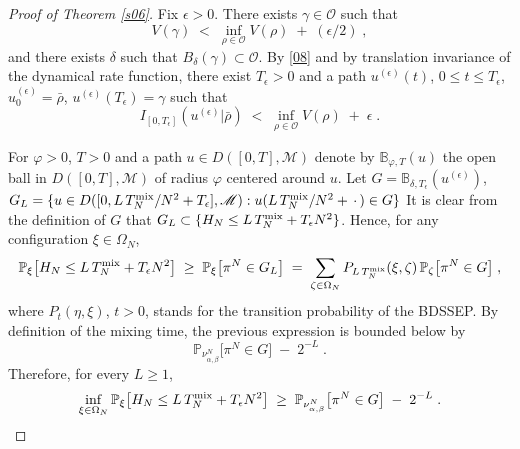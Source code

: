 \documentclass[reqno]{amsart}
\begin{document}
\begin{proof}[Proof of Theorem \ref{s06}]
Fix $\epsilon>0$. There exists $\gamma\in {{\mathscr O}}$ such that
\begin{equation*}
V(\gamma) \;<\; \inf_{\rho\in{{\mathscr O}}} V(\rho) \;+\; (\epsilon/2) \;,
\end{equation*}
and there exists $\delta$ such that $B_\delta(\gamma) \subset {{\mathscr O}}$.
By \eqref{08} and by translation invariance of the dynamical rate
function, there exist $T_\epsilon>0$ and a path $u^{(\epsilon)} (t)$,
$0\le t\le T_\epsilon $, $u^{(\epsilon)}_0 = \bar\rho$,
$u^{(\epsilon)}(T_\epsilon)=\gamma$ such that
\begin{equation}
\label{11}
I_{[0, T_\epsilon]} (u^{(\epsilon)} | \bar\rho ) \;<\; \inf_{\rho\in{{\mathscr O}}} V(\rho) 
\;+\; \epsilon\;.
\end{equation}

For $\varphi>0$, $T>0$ and a path $u\in D([0,T], {{\mathscr M}})$ denote by
${{\mathbb B}}_{\varphi, T}(u)$ the open ball in $D([0,T], {{\mathscr M}})$ of radius
$\varphi$ centered around $u$. Let $G = {{\mathbb B}}_{\delta,
  T_\epsilon}(u^{(\epsilon)})$, $G_{L} = \{ u \in D([0, L \, T^{\rm mix}_N
/ N^2 + T_\epsilon], {{\mathscr M}}) : u(L \, T^{\rm mix}_N /N^2 +
\,\cdot\,) \in G\}$ It is clear from the definition of $G$ that $G_{L}
\subset \{H_N \le L \, T^{\rm mix}_N + T_\epsilon N^2\}$. Hence, for
any configuration $\xi\in\Omega_N$,
\begin{equation*}
{{\mathbb P}}_\xi \big[ H_N \le L \, T^{\rm mix}_N + T_\epsilon N^2 \big]
\;\ge\; {{\mathbb P}}_\xi \big[ \pi^N \in G_L \big]
\;=\; \sum_{\zeta\in\Omega_N} P_{L \, T^{\rm mix}_N}(\xi,\zeta) \,
{{\mathbb P}}_\zeta \big[ \pi^N \in G \big]\;,
\end{equation*}
where $P_t(\eta,\xi)$, $t>0$, stands for the transition probability of
the BDSSEP.  By definition of the mixing time, the previous expression
is bounded below by
\begin{equation*}
{{\mathbb P}}_{\nu^N_{\alpha, \beta}} \big[ \pi^N \in G \big] \;-\; 2^{-L}\;. 
\end{equation*}
Therefore, for every $L\ge 1$,
\begin{equation}
\label{12}
\inf_{\xi \in \Omega_N}
{{\mathbb P}}_\xi \big[ H_N \le L \, T^{\rm mix}_N + T_\epsilon N^2 \big]
\;\ge\; {{\mathbb P}}_{\nu^N_{\alpha, \beta}} \big[ \pi^N \in G \big] \;-\; 2^{-L}\;. 
\end{equation}


\end{proof}
\end{document}
